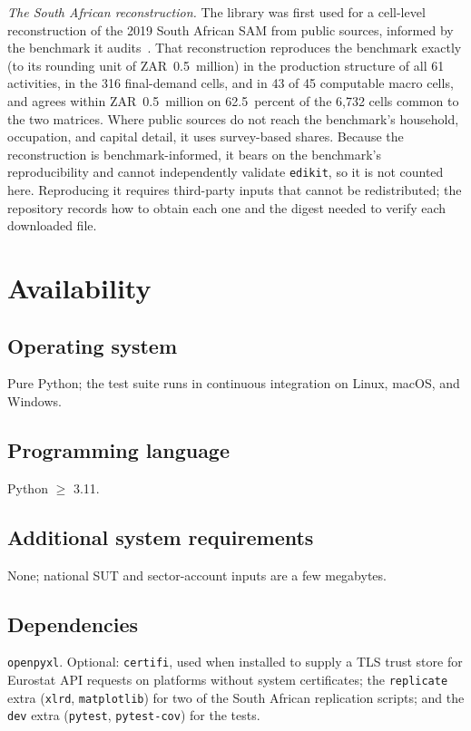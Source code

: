 \documentclass[11pt,a4paper]{article}
\begin{document}
\emph{The South African reconstruction.} The library was first used for a
cell-level reconstruction of the 2019 South African SAM from public
sources, informed by the benchmark it audits~\cite{abalo2026}. That
reconstruction reproduces the benchmark exactly (to its rounding unit of
ZAR~0.5~million) in the production structure of all 61
activities, in the 316 final-demand cells, and in 43 of 45 computable
macro cells, and agrees within ZAR~0.5~million on 62.5~percent of the 6{,}732
cells common to the two matrices. Where public sources do not reach the
benchmark's household, occupation, and capital detail, it uses
survey-based shares. Because the reconstruction is benchmark-informed, it
bears on the benchmark's reproducibility and cannot independently
validate \texttt{edikit}, so it is not counted here. Reproducing it
requires third-party inputs that cannot be redistributed; the repository
records how to obtain each one and the digest needed to verify each
downloaded file.

\section{Availability}

\subsection{Operating system}
Pure Python; the test suite runs in continuous integration on Linux,
macOS, and Windows.

\subsection{Programming language}
Python $\geq$ 3.11.

\subsection{Additional system requirements}
None; national SUT and sector-account inputs are a few megabytes.

\subsection{Dependencies}
\texttt{openpyxl}. Optional: \texttt{certifi}, used when installed to
supply a TLS trust store for Eurostat API requests on platforms without
system certificates; the \texttt{replicate} extra (\texttt{xlrd},
\texttt{matplotlib}) for two of the South African replication scripts; and the
\texttt{dev} extra (\texttt{pytest}, \texttt{pytest-cov}) for the tests.
\end{document}
